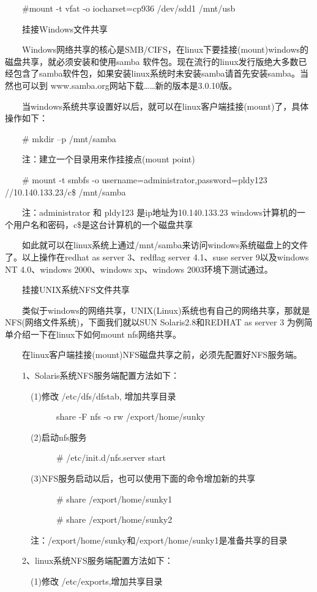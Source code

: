 \documentclass[11pt]{article}
\begin{document}
\begin{enumerate}
　　\#mount -t vfat -o iocharset=cp936 /dev/sdd1 /mnt/usb

　　挂接Windows文件共享

　　Windows网络共享的核心是SMB/CIFS，在linux下要挂接(mount)windows的磁盘共享，就必须安装和使用samba 软件包。现在流行的linux发行版绝大多数已经包含了samba软件包，如果安装linux系统时未安装samba请首先安装samba。当然也可以到 www.samba.org网站下载\ldots{}\ldots{}新的版本是3.0.10版。

　　当windows系统共享设置好以后，就可以在linux客户端挂接(mount)了，具体操作如下：

　　\# mkdir –p /mnt/samba

　　注：建立一个目录用来作挂接点(mount point)

　　\# mount -t smbfs -o username=administrator,password=pldy123 //10.140.133.23/c\$ /mnt/samba

　　注：administrator 和 pldy123 是ip地址为10.140.133.23 windows计算机的一个用户名和密码，c\$是这台计算机的一个磁盘共享

　　如此就可以在linux系统上通过/mnt/samba来访问windows系统磁盘上的文件了。以上操作在redhat as server 3、redflag server 4.1、suse server 9以及windows NT 4.0、windows 2000、windows xp、windows 2003环境下测试通过。

　　挂接UNIX系统NFS文件共享

　　类似于windows的网络共享，UNIX(Linux)系统也有自己的网络共享，那就是NFS(网络文件系统)，下面我们就以SUN Solaris2.8和REDHAT as server 3 为例简单介绍一下在linux下如何mount nfs网络共享。

　　在linux客户端挂接(mount)NFS磁盘共享之前，必须先配置好NFS服务端。

　　1、Solaris系统NFS服务端配置方法如下：

　　　(1)修改 /etc/dfs/dfstab, 增加共享目录

　　　　　　share -F nfs -o rw /export/home/sunky

　　　(2)启动nfs服务

　　　　　　\# /etc/init.d/nfs.server start

　　　(3)NFS服务启动以后，也可以使用下面的命令增加新的共享

　　　　　　\# share /export/home/sunky1

　　　　　　\# share /export/home/sunky2

　　　注：/export/home/sunky和/export/home/sunky1是准备共享的目录

　　2、linux系统NFS服务端配置方法如下：

　　　(1)修改 /etc/exports,增加共享目录


\end{enumerate}
\end{document}
